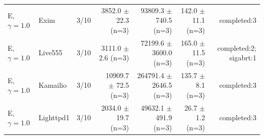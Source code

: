 \begin{table}[t]
{\begin{tabular}{llrrrrr}
E, $\gamma=1.0$ & Exim & 3/10 & 3852.0 $\pm$ 22.3 (n=3) & 93809.3 $\pm$ 740.5 (n=3) & 142.0 $\pm$ 11.1 (n=3) & completed:3 \\
E, $\gamma=1.0$ & Live555 & 3/10 & 3111.0 $\pm$ 2.6 (n=3) & 72199.6 $\pm$ 3600.0 (n=3) & 165.0 $\pm$ 11.5 (n=3) & completed:2; sigabrt:1 \\
E, $\gamma=1.0$ & Kamailio & 3/10 & 10909.7 $\pm$ 72.5 (n=3) & 264791.4 $\pm$ 2646.5 (n=3) & 135.7 $\pm$ 8.1 (n=3) & completed:3 \\
E, $\gamma=1.0$ & Lighttpd1 & 3/10 & 2034.0 $\pm$ 19.7 (n=3) & 49632.1 $\pm$ 491.9 (n=3) & 26.7 $\pm$ 1.2 (n=3) & completed:3 \\
\bottomrule
\end{tabular}%
}
\end{table}

